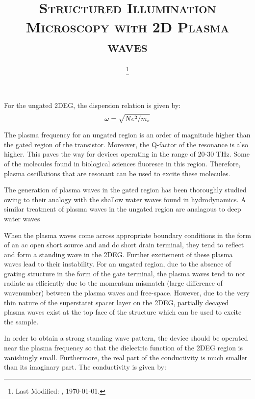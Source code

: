 \documentclass[11pt]{article}
\begin{document}
\title{\textsc{Structured Illumination Microscopy with 2D Plasma waves}\\}
\date{\footnote{Last Modified: \currenttime, \today.}}
\maketitle

%


For the ungated 2DEG, the dispersion relation is given by:
\begin{equation}
  \omega = \sqrt{Ne^2 /m_s}
  \label{eq:ungated_disp}
\end{equation}

The plasma frequency for an ungated region is an order of magnitude higher than the gated region of the transistor. Moreover, the Q-factor of the resonance is also higher. This paves the way for devices operating in the range of 20-30 THz. Some of the molecules found in biological sciences fluoresce in this region. Therefore, plasma oscillations that are resonant can be used to excite these molecules.

The generation of plasma waves in the gated region has been thoroughly studied owing to their analogy with the shallow water waves found in hydrodynamics. A similar treatment of plasma waves in the ungated region are analagous to deep water waves

When the plasma waves come across appropriate boundary conditions in the form of an ac open short source and and dc short drain terminal, they tend to reflect and form a standing wave in the 2DEG. Further excitement of these plasma waves lead to their instability. For an ungated region, due to the absence of grating structure in the form of the gate terminal, the plasma waves tend to not radiate as efficiently due to the momentum mismatch (large difference of wavenumber) between the plasma waves and free-space. However, due to the very thin nature of the superstatet spacer layer on the 2DEG, partially decayed plasma waves exist at the top face of the structure which can be used to excite the sample.

In order to obtain a strong standing wave pattern, the device should be operated near the plasma frequency so that the dielectric function of the 2DEG region is vanishingly small. Furthermore, the real part of the conductivity is much smaller than its imaginary part. The conductivity is given by:
\end{document}
